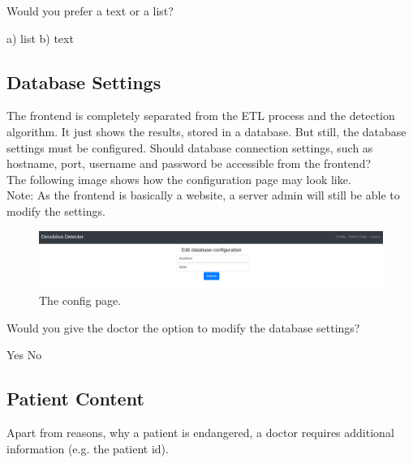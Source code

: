 \documentclass{exam}
\begin{document}
\begin{questions}

\question Would you prefer a text or a list?

\begin{checkboxes}
	\choice a) list
	\choice b) text
\end{checkboxes}

\end{questions}

\subsection*{Database Settings}

The frontend is completely separated from the ETL process and the detection algorithm. It just shows the results, stored in a database. 
But still, the database settings must be configured. Should database connection settings, such as hostname, port, username and password
be accessible from the frontend?\\
The following image shows how the configuration page may look like. \\
Note: As the frontend is basically a website, a server admin will still be able to modify the settings.

\begin{figure}[H]
	\centering
  \includegraphics[width=0.8\linewidth]{images/db.png}
	\captionsetup{labelformat=empty}
	\caption{The config page.}
  \label{fig:text}
\end{figure}

\begin{questions}
\question Would you give the doctor the option to modify the database settings?

\begin{checkboxes}
	\choice Yes
	\choice No
\end{checkboxes}

\end{questions}

\subsection*{Patient Content}

Apart from reasons, why a patient is endangered, a doctor requires additional information (e.g. the patient id). 
\end{document}
